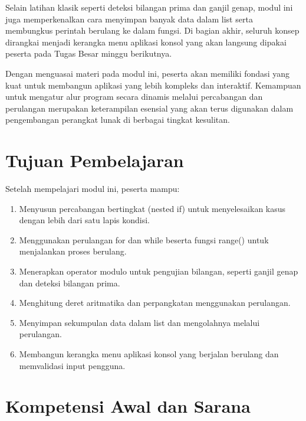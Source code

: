 \documentclass[12pt,a4paper]{article}
\begin{document}
Selain latihan klasik seperti deteksi bilangan prima dan ganjil genap, modul ini juga memperkenalkan cara menyimpan banyak data dalam list serta membungkus perintah berulang ke dalam fungsi. Di bagian akhir, seluruh konsep dirangkai menjadi kerangka menu aplikasi konsol yang akan langsung dipakai peserta pada Tugas Besar minggu berikutnya.

Dengan menguasai materi pada modul ini, peserta akan memiliki fondasi yang kuat untuk membangun aplikasi yang lebih kompleks dan interaktif. Kemampuan untuk mengatur alur program secara dinamis melalui percabangan dan perulangan merupakan keterampilan esensial yang akan terus digunakan dalam pengembangan perangkat lunak di berbagai tingkat kesulitan.

\section{Tujuan Pembelajaran}

Setelah mempelajari modul ini, peserta mampu:

\begin{enumerate}[label=\alph*)]
    \item Menyusun percabangan bertingkat (nested if) untuk menyelesaikan kasus dengan lebih dari satu lapis kondisi.
    \item Menggunakan perulangan for dan while beserta fungsi range() untuk menjalankan proses berulang.
    \item Menerapkan operator modulo untuk pengujian bilangan, seperti ganjil genap dan deteksi bilangan prima.
    \item Menghitung deret aritmatika dan perpangkatan menggunakan perulangan.
    \item Menyimpan sekumpulan data dalam list dan mengolahnya melalui perulangan.
    \item Membangun kerangka menu aplikasi konsol yang berjalan berulang dan memvalidasi input pengguna.
\end{enumerate}

\section{Kompetensi Awal dan Sarana}
\end{document}
